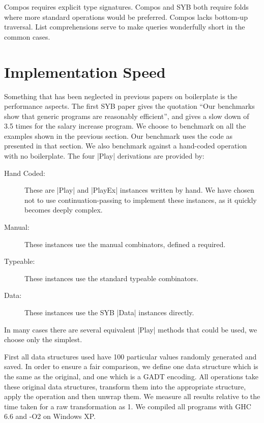 \documentclass[preprint]{sigplanconf}
\begin{document}
Compos requires explicit type signatures. Compos and SYB both require folds where more standard operations would be preferred. Compos lacks bottom-up traversal. List comprehensions serve to make queries wonderfully short in the common cases.


\section{Implementation Speed}

Something that has been neglected in previous papers on boilerplate is the performance aspects. The first SYB paper gives the quotation ``Our benchmarks show that generic programs are reasonably efficient'', and gives a slow down of 3.5 times for the salary increase program. We choose to benchmark on all the examples shown in the previous section. Our benchmark uses the code as presented in that section. We also benchmark against a hand-coded operation with no boilerplate. The four |Play| derivations are provided by:

\begin{description}
\item[Hand Coded:] These are |Play| and |PlayEx| instances written by hand. We have chosen not to use continuation-passing to implement these instances, as it quickly becomes deeply complex.
\item[Manual:] These instances use the manual combinators, defined a required.
\item[Typeable:] These instances use the standard typeable combinators.
\item[Data:] These instances use the SYB |Data| instances directly.
\end{description}

In many cases there are several equivalent |Play| methods that could be used, we choose only the simplest.

First all data structures used have 100 particular values randomly generated and saved. In order to ensure a fair comparison, we define one data structure which is the same as the original, and one which is a GADT encoding. All operations take these original data structures, transform them into the appropriate structure, apply the operation and then unwrap them. We measure all results relative to the time taken for a raw transformation as 1. We compiled all programs with GHC 6.6 and -O2 on Windows XP.
\end{document}
